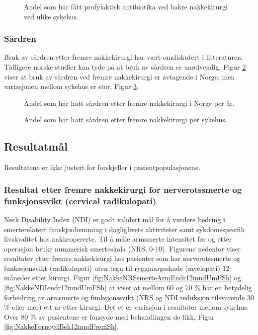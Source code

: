 \begin{figure}[ht]
\caption{\label{fig:NakkeAntibiotikaBakSh} Andel som har fått profylaktisk antibiotika ved bakre nakkekirurgi ved ulike sykehus. }
\end{figure}

\subsubsection{Sårdren}

Bruk av sårdren etter fremre nakkekirurgi har vært omdiskutert i litteraturen. Tidligere norske studier kan tyde på at bruk av sårdren er unødvendig. Figur \ref{fig:NakkeSaardrenUmFTid} viser at bruk av sårdren ved fremre nakkekirurgi er avtagende i Norge, men variasjonen mellom sykehus er stor, Figur \ref{fig:NakkeSaardrenUmFSh}.

\begin{figure}[ht]
\caption{\label{fig:NakkeSaardrenUmFTid} Andel som har hatt sårdren etter fremre nakkekirurgi i Norge per år.}
\end{figure}

\begin{figure}[ht]
\caption{\label{fig:NakkeSaardrenUmFSh} Andel som har hatt sårdren etter fremre nakkekirurgi per sykehus.}
\end{figure}

\subsection{Resultatmål}


Resultatene er ikke justert for forskjeller i pasientpopulasjonene.
\subsubsection{Resultat etter fremre nakkekirurgi for nerverotssmerte og funksjonssvikt (cervical radikulopati)}
Neck Disability Index (NDI) er godt validert mål for å vurdere bedring i smerterelatert funskjonhemming  i dagliglivets aktiviteter samt sykdomsspesifik livskvalitet hos nakkeopererte. Til å måle armsmerte intensitet før og etter operasjon bruke nummerisk smerteskala (NRS, 0-10). Figurene nedenfor viser resultater etter fremre nakkekirurgi hos pasienter som har nerverotssmerte og funkssjonsvikt (radikulopati) uten tegn til ryggmargsskade (myelopati) 12 måneder etter kirurgi. Figur \ref{fig:NakkeNRSsmerteArmEndr12mndUmFSh} og  \ref{fig:NakkeNDIendr12mndUmFSh} at viser at mellom 60 og 70 \% har en betydelig forbedring av armsmerte og funksjonssvikt (NRS og NDI reduksjon tilsvarende 30 \%  eller mer) ett år etter kirurgi. Det et er variasjon i resultater mellom sykehus. Over 80 \% av pasientene er fonøyde med behandlingen de fikk, Figur \ref{fig:NakkeFornoydBeh12mndFremSh}.    
